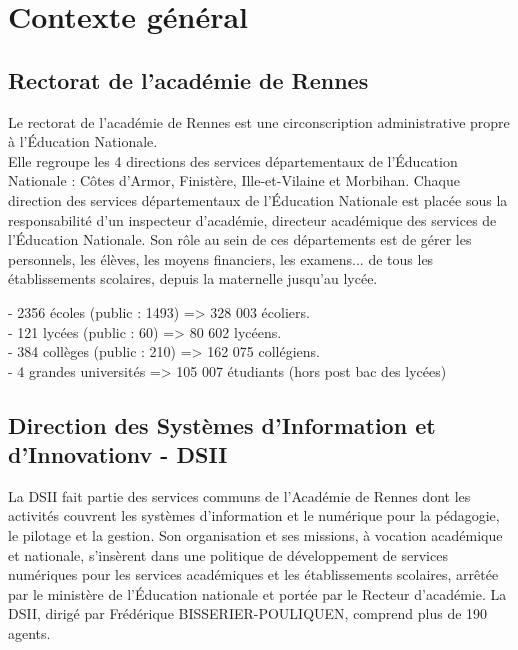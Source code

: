 \documentclass[12pt]{article}
\begin{document}
\newpage


   

\section{Contexte général}
\subsection{Rectorat de l’académie de Rennes}

Le rectorat de l'académie de Rennes est une circonscription administrative propre à l’Éducation Nationale.\\
Elle regroupe les 4 directions des services départementaux de l'Éducation Nationale : 
Côtes d'Armor, Finistère, Ille-et-Vilaine et Morbihan. Chaque direction des services départementaux de l'Éducation Nationale est placée sous la responsabilité d'un inspecteur d'académie, directeur académique des services de l'Éducation Nationale. Son rôle au sein de ces départements est de gérer les personnels, les élèves, les moyens financiers, les examens... de tous les établissements scolaires, depuis la maternelle jusqu'au lycée.


- 2356 écoles (public : 1493) => 328 003 écoliers.\\


- 121 lycées (public : 60) => 80 602 lycéens.\\


- 384 collèges (public : 210) => 162 075 collégiens.\\

- 4 grandes universités => 105 007 étudiants (hors post bac des lycées)\\

\subsection{Direction des Systèmes d'Information et d'Innovationv - DSII }


La DSII fait partie des services communs de l’Académie de Rennes dont les activités couvrent les systèmes d’information et le numérique pour la pédagogie, le pilotage et la gestion.
Son organisation et ses missions, à vocation académique et nationale, s’insèrent dans une politique de développement de services numériques pour les services académiques et les établissements scolaires, arrêtée par le ministère de l’Éducation nationale et portée par le Recteur d’académie.
La DSII, dirigé par Frédérique BISSERIER-POULIQUEN, comprend plus de 190 agents.
\end{document}
